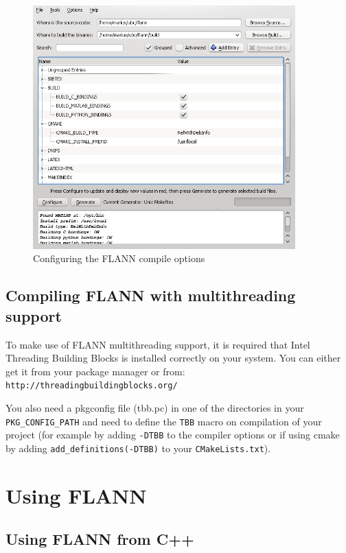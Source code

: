 \documentclass[letter,10pt]{article}
\begin{document}
\begin{figure}[h]
  \begin{center}
    \includegraphics[width=0.9\textwidth]{images/cmake-gui.png}
    \caption{Configuring the FLANN compile options}
    \label{fig:cmake-gui}
  \end{center}
\end{figure}

\subsection{Compiling FLANN with multithreading support}
To make use of FLANN multithreading support, it is required that Intel Threading Building Blocks is installed correctly
on your system. You can either get it from your package manager or from: \texttt{http://threadingbuildingblocks.org/}

You also need a pkgconfig file (tbb.pc) in one of the directories in your \texttt{PKG\_CONFIG\_PATH} and need to define
the \texttt{TBB} macro on compilation of your project (for example by adding \texttt{-DTBB} to the compiler options or
if using cmake by adding \texttt{add\_definitions(-DTBB)} to your \texttt{CMakeLists.txt}).

\section{Using FLANN}

\subsection{Using FLANN from C++}
\end{document}
